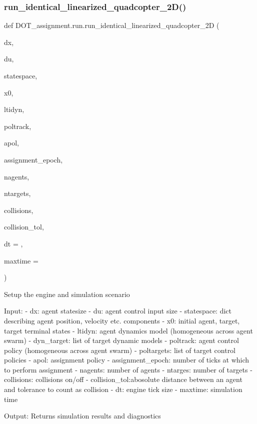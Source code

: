 \subsubsection{\texorpdfstring{run\_identical\_linearized\_quadcopter\_2D()}{run\_identical\_linearized\_quadcopter\_2D()}}
{\footnotesize\ttfamily def D\+O\+T\+\_\+assignment.\+run.\+run\+\_\+identical\+\_\+linearized\+\_\+quadcopter\+\_\+2D (\begin{DoxyParamCaption}\item[{}]{dx,  }\item[{}]{du,  }\item[{}]{statespace,  }\item[{}]{x0,  }\item[{}]{ltidyn,  }\item[{}]{poltrack,  }\item[{}]{apol,  }\item[{}]{assignment\+\_\+epoch,  }\item[{}]{nagents,  }\item[{}]{ntargets,  }\item[{}]{collisions,  }\item[{}]{collision\+\_\+tol,  }\item[{}]{dt = {},  }\item[{}]{maxtime = {} }\end{DoxyParamCaption})}

\begin{DoxyVerb}Setup the engine and simulation scenario

Input:
    - dx:           agent statesize
    - du:           agent control input size
    - statespace:   dict describing agent position, velocity etc. components
    - x0:           initial agent, target, target terminal states
    - ltidyn:       agent dynamics model (homogeneous across agent swarm)
    - dyn_target:   list of target dynamic models
    - poltrack:     agent control policy (homogeneous across agent swarm)
    - poltargets:   list of target control policies
    - apol:         assignment policy
    - assignment_epoch: number of ticks at which to perform assignment
    - nagents:      number of agents
    - ntarges:      number of targets
    - collisions:   collisions on/off
    - collision_tol:abosolute distance between an agent and tolerance to count as collision
    - dt:           engine tick size
    - maxtime:      simulation time

Output: Returns simulation results and diagnostics\end{DoxyVerb}
 \mbox{\label{namespace_d_o_t__assignment_1_1run_ab24ec46198cb710a165623079674d8b2}} 
